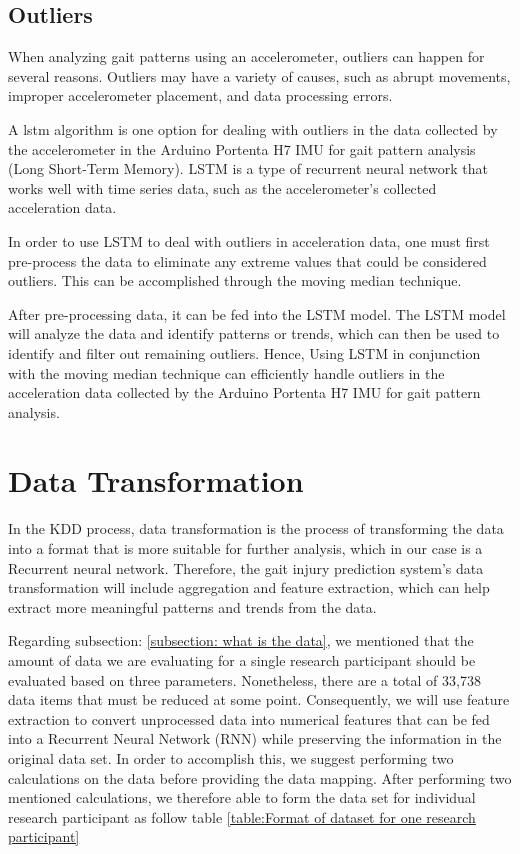 \subsection{Outliers}
When analyzing gait patterns using an accelerometer, outliers can happen for several reasons. Outliers may have a variety of causes, such as abrupt movements, improper accelerometer placement, and data processing errors.

\bigskip

A \ac{lstm} algorithm is one option for dealing with outliers in the data collected by the accelerometer in the Arduino Portenta H7 IMU for gait pattern analysis (Long Short-Term Memory). LSTM is a type of recurrent neural network that works well with time series data, such as the accelerometer's collected acceleration data.

\bigskip

In order to use LSTM to deal with outliers in acceleration data, one must first pre-process the data to eliminate any extreme values that could be considered outliers. This can be accomplished through the moving median technique.

\bigskip

After pre-processing data, it can be fed into the LSTM model. The LSTM model will analyze the data and identify patterns or trends, which can then be used to identify and filter out remaining outliers. Hence, Using LSTM in conjunction with the moving median technique can efficiently handle outliers in the acceleration data collected by the Arduino Portenta H7 IMU for gait pattern analysis.

\section{Data Transformation}
\label{section:Data Transformation}

In the KDD process, data transformation is the process of transforming the data into a format that is more suitable for further analysis, which in our case is a Recurrent neural network. Therefore, the gait injury prediction system's data transformation will include aggregation and feature extraction, which can help extract more meaningful patterns and trends from the data.

\bigskip

Regarding subsection: \ref{subsection: what is the data}, we mentioned that the amount of data we are evaluating for a single research participant should be evaluated based on three parameters. Nonetheless, there are a total of 33,738 data items that must be reduced at some point. Consequently, we will use feature extraction to convert unprocessed data into numerical features that can be fed into a Recurrent Neural Network (RNN) while preserving the information in the original data set. In order to accomplish this, we suggest performing two calculations on the data before providing the data mapping. After performing two mentioned calculations, we therefore able to form the data set for individual research participant as follow table \ref{table:Format of dataset for one research participant}


